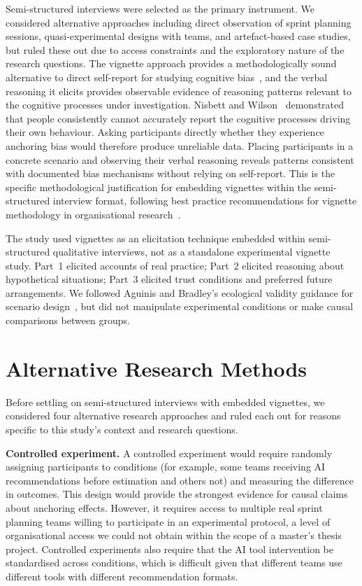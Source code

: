 \documentclass[a4paper,twoside]{bth}
\begin{document}
Semi-structured interviews were selected as the primary instrument. We considered alternative approaches including direct observation of sprint planning sessions, quasi-experimental designs with teams, and artefact-based case studies, but ruled these out due to access constraints and the exploratory nature of the research questions. The vignette approach provides a methodologically sound alternative to direct self-report for studying cognitive bias~\cite{aguinis2014best, nisbett1977telling}, and the verbal reasoning it elicits provides observable evidence of reasoning patterns relevant to the cognitive processes under investigation. Nisbett and Wilson~\cite{nisbett1977telling} demonstrated that people consistently cannot accurately report the cognitive processes driving their own behaviour. Asking participants directly whether they experience anchoring bias would therefore produce unreliable data. Placing participants in a concrete scenario and observing their verbal reasoning reveals patterns consistent with documented bias mechanisms without relying on self-report. This is the specific methodological justification for embedding vignettes within the semi-structured interview format, following best practice recommendations for vignette methodology in organisational research~\cite{aguinis2014best}.

The study used vignettes as an elicitation technique embedded within semi-structured qualitative interviews, not as a standalone experimental vignette study. Part~1 elicited accounts of real practice; Part~2 elicited reasoning about hypothetical situations; Part~3 elicited trust conditions and preferred future arrangements. We followed Aguinis and Bradley's ecological validity guidance for scenario design~\cite{aguinis2014best}, but did not manipulate experimental conditions or make causal comparisons between groups.

\section{Alternative Research Methods}
\label{sec:alternatives}

Before settling on semi-structured interviews with embedded vignettes, we considered four alternative research approaches and ruled each out for reasons specific to this study's context and research questions.

\textbf{Controlled experiment.} A controlled experiment would require randomly assigning participants to conditions (for example, some teams receiving AI recommendations before estimation and others not) and measuring the difference in outcomes. This design would provide the strongest evidence for causal claims about anchoring effects. However, it requires access to multiple real sprint planning teams willing to participate in an experimental protocol, a level of organisational access we could not obtain within the scope of a master's thesis project. Controlled experiments also require that the AI tool intervention be standardised across conditions, which is difficult given that different teams use different tools with different recommendation formats.
\end{document}
